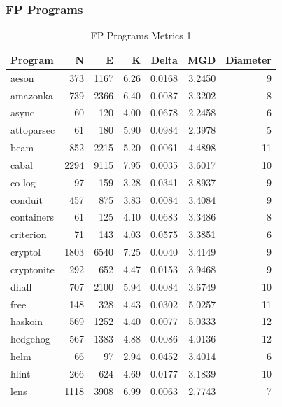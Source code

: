 \documentclass[12pt, a4paper]{article}
\begin{document}
\subsubsection{FP Programs}
\begin{longtable}[H]{l r r r r r r}
    \caption{FP Programs Metrics 1}\label{table:fp_metrics_1}\\
        Program &  N & E & K & Delta & MGD & Diameter\\
        \hline            
        \endhead
        aeson     &  373 &  1167  & 6.26 & 0.0168 & 3.2450 &  9 \\      
        amazonka  &  739 &  2366  & 6.40 & 0.0087 & 3.3202 &  8 \\      
        async     &   60 &   120  & 4.00 & 0.0678 & 2.2458 &  6 \\      
        attoparsec&   61 &   180  & 5.90 & 0.0984 & 2.3978 &  5 \\      
        beam      &  852 &  2215  & 5.20 & 0.0061 & 4.4898 & 11 \\      
        cabal     & 2294 &  9115  & 7.95 & 0.0035 & 3.6017 & 10 \\      
        co-log    &   97 &   159  & 3.28 & 0.0341 & 3.8937 &  9 \\      
        conduit   &  457 &   875  & 3.83 & 0.0084 & 3.4084 &  9 \\      
        containers&   61 &   125  & 4.10 & 0.0683 & 3.3486 &  8 \\      
        criterion &   71 &   143  & 4.03 & 0.0575 & 3.3851 &  6 \\      
        cryptol   & 1803 &  6540  & 7.25 & 0.0040 & 3.4149 &  9 \\      
        cryptonite&  292 &   652  & 4.47 & 0.0153 & 3.9468 &  9 \\      
        dhall     &  707 &  2100  & 5.94 & 0.0084 & 3.6749 & 10 \\      
        free      &  148 &   328  & 4.43 & 0.0302 & 5.0257 & 11 \\      
        haskoin   &  569 &  1252  & 4.40 & 0.0077 & 5.0333 & 12 \\      
        hedgehog  &  567 &  1383  & 4.88 & 0.0086 & 4.0136 & 12 \\      
        helm      &   66 &    97  & 2.94 & 0.0452 & 3.4014 &  6 \\      
        hlint     &  266 &   624  & 4.69 & 0.0177 & 3.1839 & 10 \\      
        lens      & 1118 &  3908  & 6.99 & 0.0063 & 2.7743 &  7 \\      

\end{longtable}
\end{document}
